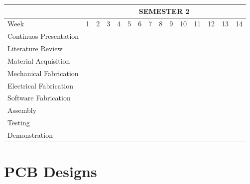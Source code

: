 \begin{table}[H]
  \begin{center}
    \leavevmode
{}
\begin{tabular}{|l|c|c|c|c|c|c|c|c|c|c|c|c|c|c|} \hline
& \multicolumn{14}{c|}{SEMESTER 2} \\ \hline
\rowcolor{white} Week & 1 & 2 & 3 & 4 & 5 & 6 & 7 & 8 & 9 & 10 & 11 & 12 & 13 & 14 \\ \hline
\rowcolor{white} Continuos Presentation & \cellcolor{black} & \cellcolor{black} & \cellcolor{black} & \cellcolor{black} & \cellcolor{black} & \cellcolor{black} & \cellcolor{black} & \cellcolor{black} & \cellcolor{black} & & & & & \\ \hline
\rowcolor{white} Literature Review & \cellcolor{black} & \cellcolor{black} & \cellcolor{black} & \cellcolor{black} & \cellcolor{black} & & & & & & & & & \\ \hline
\rowcolor{white} Material Acquisition & \cellcolor{black} & \cellcolor{black} & & & & & & & & & & & & \\ \hline
\rowcolor{white} Mechanical Fabrication & & \cellcolor{black} & \cellcolor{black} & \cellcolor{black} & & & & & & & & & & \\ \hline
\rowcolor{white} Electrical Fabrication & & & \cellcolor{black} & \cellcolor{black} & \cellcolor{black} & & & & & & & & & \\ \hline
\rowcolor{white} Software Fabrication & & & & \cellcolor{black} & \cellcolor{black} & \cellcolor{black} & \cellcolor{black} & & & & & & & \\ \hline

\rowcolor{white} Assembly & & & & & & \cellcolor{black} & \cellcolor{black} & \cellcolor{black} & \cellcolor{black} & & & & & \\ \hline
\rowcolor{white} Testing & & & & & & \cellcolor{black} & \cellcolor{black} & \cellcolor{black} & \cellcolor{black} & \cellcolor{black} & \cellcolor{black} & & & \\ \hline
\rowcolor{white} Demonstration & & & & & & & & & & \cellcolor{black} & \cellcolor{black} & \cellcolor{black} & \cellcolor{black} & \cellcolor{black} \\ \hline
\end{tabular}

\label{table:semester2timeplan}
\end{center}
\end{table}


\section{PCB Designs}

